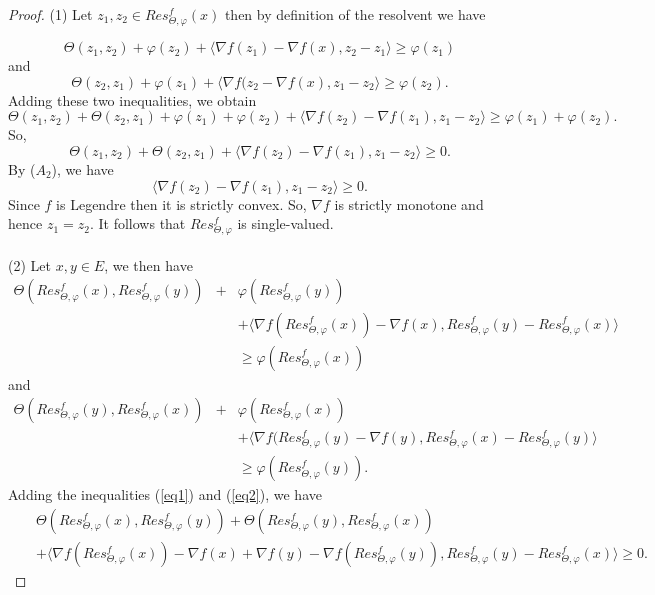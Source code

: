 \documentclass[reqno,b5paper]{amsart}
\theoremstyle{plain}
\theoremstyle{definition}
\numberwithin{equation}{section}
\numberwithin{equation}{section}
\begin{document}
\begin{proof}
(1) Let $z_{1}, z_{2}\in Res_{\Theta,\varphi}^{f}(x)$ then by definition of the resolvent we have

$$\Theta(z_{1},z_{2})+\varphi (z_{2}) +\langle \nabla f(z_{1})-\nabla f(x),z_{2}-z_{1}\rangle\geq \varphi(z_{1})$$
and
$$ \Theta (z_{2},z_{1})+\varphi(z_{1})+\langle \nabla f(z_{2}-\nabla f(x),z_{1}-z_{2}\rangle \geq \varphi(z_{2}).$$
Adding these two inequalities, we obtain
$$\Theta (z_{1},z_{2})+\Theta(z_{2},z_{1})+\varphi(z_{1})+\varphi(z_{2})+\langle \nabla f(z_{2})-\nabla f(z_{1}),z_{1}-z_{2}\rangle\geq \varphi(z_{1})+\varphi(z_{2}).$$
So, $$\Theta (z_{1},z_{2})+\Theta(z_{2},z_{1})+\langle \nabla f(z_{2})-\nabla f(z_{1}),z_{1}-z_{2}\rangle\geq 0.$$
By ($A_{2}$), we have
$$\langle \nabla f(z_{2})-\nabla f(z_{1}),z_{1}-z_{2}\rangle\geq0.$$
Since $f$ is Legendre then it is strictly convex. So, $\nabla f$ is strictly monotone and hence $z_{1}=z_{2}$. It follows that $Res_{\Theta,\varphi}^{f}$ is single-valued. \\
\\
(2) Let $x,y\in E$, we then have
\begin{eqnarray}
\Theta(Res_{\Theta,\varphi}^{f}(x),Res_{\Theta,\varphi}^{f}(y))&+&\varphi(Res_{\Theta,\varphi}^{f}(y)) \nonumber\\
&&+\langle \nabla f(Res_{\Theta,\varphi}^{f}(x))-\nabla f(x),Res_{\Theta,\varphi}^{f}(y)-Res_{\Theta,\varphi}^{f}(x)\rangle\nonumber\\
&&\geq \varphi(Res_{\Theta,\varphi}^{f}(x))\label{eq1}
\end{eqnarray}
and
\begin{eqnarray}
\Theta(Res_{\Theta,\varphi}^{f}(y),Res_{\Theta,\varphi}^{f}(x))&+&\varphi(Res_{\Theta,\varphi}^{f}(x))\nonumber\\
&&+\langle \nabla f(Res_{\Theta,\varphi}^{f}(y)-\nabla f(y),Res_{\Theta,\varphi}^{f}(x)-Res_{\Theta,\varphi}^{f}(y)\rangle\nonumber\\
&&\geq \varphi(Res_{\Theta,\varphi}^{f}(y)).\label{eq2}
\end{eqnarray}
Adding the inequalities (\ref{eq1}) and (\ref{eq2}), we have
\begin{eqnarray*}
&&\Theta (Res_{\Theta,\varphi}^{f}(x),Res_{\Theta,\varphi}^{f}(y))+\Theta(Res_{\Theta,\varphi}^{f}(y),Res_{\Theta,\varphi}^{f}(x))\\
&&+\langle \nabla f(Res_{\Theta,\varphi}^{f}(x))-\nabla f(x)+\nabla f(y)-\nabla f(Res_{\Theta,\varphi}^{f}(y)),Res_{\Theta,\varphi}^{f}(y)-Res_{\Theta,\varphi}^{f}(x)\rangle\geq0.

\end{eqnarray*}
\end{proof}
\end{document}

